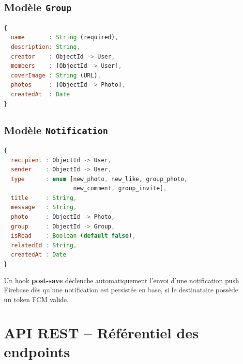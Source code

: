 \documentclass[12pt, a4paper, openany]{report}
\begin{document}
\subsection{Modèle \texttt{Group}}

\begin{lstlisting}[language=JavaScript, caption=Schéma Group.js]
{
  name       : String (required),
  description: String,
  creator    : ObjectId -> User,
  members    : [ObjectId -> User],
  coverImage : String (URL),
  photos     : [ObjectId -> Photo],
  createdAt  : Date
}
\end{lstlisting}

\subsection{Modèle \texttt{Notification}}

\begin{lstlisting}[language=JavaScript, caption=Schéma Notification.js]
{
  recipient : ObjectId -> User,
  sender    : ObjectId -> User,
  type      : enum [new_photo, new_like, group_photo,
                    new_comment, group_invite],
  title     : String,
  message   : String,
  photo     : ObjectId -> Photo,
  group     : ObjectId -> Group,
  isRead    : Boolean (default false),
  relatedId : String,
  createdAt : Date
}
\end{lstlisting}

Un hook \textbf{post-save} déclenche automatiquement l'envoi d'une notification push Firebase
dès qu'une notification est persistée en base, si le destinataire possède un token FCM valide.

\section{API REST -- Référentiel des endpoints}
\end{document}
